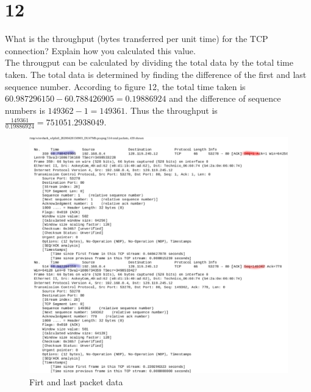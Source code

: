\documentclass{article}
\begin{document}
\section*{12}
What is the throughput (bytes transferred per unit time) for the TCP connection?
Explain how you calculated this value.\\
\newline The througput can be calculated by dividing the total data by the total time taken.  The total data is determined by finding the difference of the first and last sequence number. According to figure 12, the total time taken is $60.987296150 - 60.788426905 = 0.19886924$ and the difference of sequence numbers is $149362-1 = 149361$.  Thus the throughput is $\frac{149361}{0.19886924} = 751051.2938049$.\\
\begin{figure}[h!]
\centering
\includegraphics[scale=0.4]{Q12.pdf}
\caption{Firt and last packet data}
\end{figure}
\end{document}
